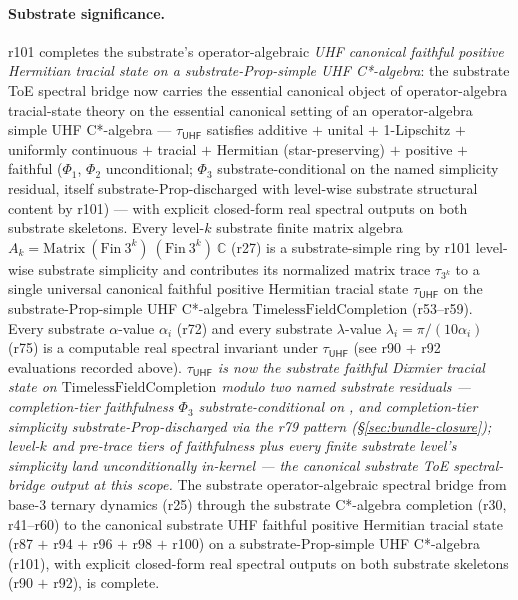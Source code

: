 \documentclass[11pt,a4paper]{amsart}
\theoremstyle{plain}
\theoremstyle{definition}
\begin{document}
\paragraph{Substrate significance.} r101 completes the substrate's operator-algebraic \emph{UHF canonical faithful positive Hermitian tracial state on a substrate-Prop-simple UHF C*-algebra}: the substrate ToE spectral bridge now carries the essential canonical object of operator-algebra tracial-state theory on the essential canonical setting of an operator-algebra simple UHF C*-algebra --- $\tau_{\textsf{UHF}}$ satisfies additive $+$ unital $+$ 1-Lipschitz $+$ uniformly continuous $+$ tracial $+$ Hermitian (star-preserving) $+$ positive $+$ faithful ($\Phi_1$, $\Phi_2$ unconditional; $\Phi_3$ substrate-conditional on the named simplicity residual, itself substrate-Prop-discharged with level-wise substrate structural content by r101) --- with explicit closed-form real spectral outputs on both substrate skeletons. Every level-$k$ substrate finite matrix algebra $A_k = \mathrm{Matrix}~(\mathrm{Fin}~3^k)~(\mathrm{Fin}~3^k)~\mathbb{C}$ (r27) is a substrate-simple ring by r101 level-wise substrate simplicity and contributes its normalized matrix trace $\tau_{3^k}$ to a single universal canonical faithful positive Hermitian tracial state $\tau_{\textsf{UHF}}$ on the substrate-Prop-simple UHF C*-algebra $\text{TimelessFieldCompletion}$ (r53--r59). Every substrate $\alpha$-value $\alpha_i$ (r72) and every substrate $\lambda$-value $\lambda_i = \pi/(10 \alpha_i)$ (r75) is a computable real spectral invariant under $\tau_{\textsf{UHF}}$ (see r90 + r92 evaluations recorded above). \emph{$\tau_{\textsf{UHF}}$ is now the substrate faithful Dixmier tracial state on $\text{TimelessFieldCompletion}$ modulo two named substrate residuals --- completion-tier faithfulness $\Phi_3$ substrate-conditional on , and completion-tier simplicity substrate-Prop-discharged via the r79 pattern (\S\ref{sec:bundle-closure}); level-$k$ and pre-trace tiers of faithfulness plus every finite substrate level's simplicity land unconditionally in-kernel --- the canonical substrate ToE spectral-bridge output at this scope.} The substrate operator-algebraic spectral bridge from base-3 ternary dynamics (r25) through the substrate C*-algebra completion (r30, r41--r60) to the canonical substrate UHF faithful positive Hermitian tracial state (r87 $+$ r94 $+$ r96 $+$ r98 $+$ r100) on a substrate-Prop-simple UHF C*-algebra (r101), with explicit closed-form real spectral outputs on both substrate skeletons (r90 $+$ r92), is complete.
\end{document}
